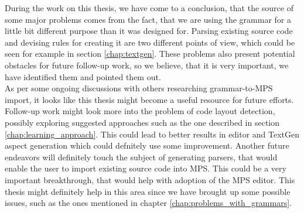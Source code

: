 During the work on this thesis, we have come to a conclusion, that the source of some major problems comes from the fact, that we are using the grammar for a little bit different purpose than it was designed for.
Parsing existing source code and devising rules for creating it are two different points of view, which could be seen for example in section \ref{chap:textgen}.
These problems also present potential obstacles for future follow-up work, so we believe, that it is very important, we have identified them and pointed them out.
\\

As per some ongoing discussions with others researching grammar-to-MPS import, it looks like this thesis might become a useful resource for future efforts.
Follow-up work might look more into the problem of code layout detection, possibly exploring suggested approaches such as the one described in section \ref{chap:learning_approach}.
This could lead to better results in editor and TextGen aspect generation which could defnitely use some improvement.
Another future endeavors will definitely touch the subject of generating parsers, that would enable the user to import existing source code into MPS.
This could be a very important breakthrough, that would help with adoption of the MPS editor.
This thesis might definitely help in this area since we have brought up some possible issues, such as the ones mentioned in chapter \ref{chap:problems_with_grammars}.
